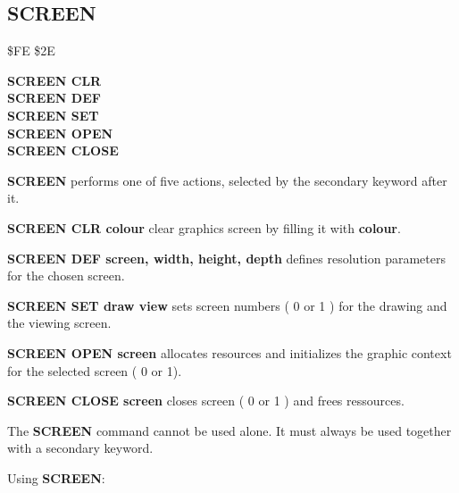 \subsection{SCREEN}
\begin{description}[leftmargin=3cm,style=nextline]
\item [Token:] \$FE \$2E
\item [Format:] {\bf SCREEN CLR} \\
                {\bf SCREEN DEF} \\
                {\bf SCREEN SET} \\
                {\bf SCREEN OPEN} \\
                {\bf SCREEN CLOSE}

\item [Usage:] {\bf SCREEN} performs one of five actions,
               selected by the secondary keyword after it.

                {\bf SCREEN CLR colour} clear graphics screen
                by filling it with {\bf colour}.

                {\bf SCREEN DEF screen, width, height, depth}
                defines resolution parameters for the chosen
                screen.

                {\bf SCREEN SET draw view} sets screen numbers
                ( 0 or 1 ) for the drawing and the viewing screen.

                {\bf SCREEN OPEN screen} allocates resources and
                initializes the graphic context for the selected
                screen ( 0 or 1).

                {\bf SCREEN CLOSE screen } closes screen
                ( 0 or 1 ) and frees ressources.

\item [Remarks:] The {\bf SCREEN} command cannot be used alone.
               It must always be used together with a secondary keyword.

\item [Example:] Using {\bf SCREEN}:
\end{description}

